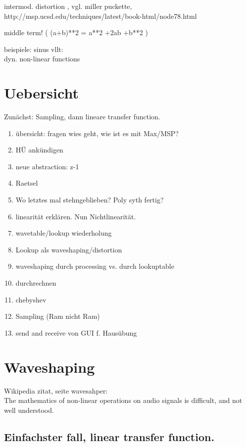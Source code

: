 \glqq{}intermod. distortion \grqq{} , vgl. miller puckette, \\
http://msp.ucsd.edu/techniques/latest/book-html/node78.html

middle term! ( (a+b)**2 = a**2 +2ab +b**2 ) 




beispiele:
sinus
vllt:\\
dyn. non-linear functions




\section{Uebersicht}
Zunächst: Sampling, dann lineare transfer function.

\begin{enumerate}
	\item übersicht: fragen wies geht, wie ist es mit Max/MSP?
	\item HÜ ankündigen
	\item neue abstraction: z-1 
	\item Raetsel
	\item Wo letztes mal stehngeblieben? Poly syth fertig?
	\item linearität erklären. Nun Nichtlinearität.
	\item wavetable/lookup wiederholung
	\item Lookup als waveshaping/distortion
	\item waveshaping durch processing vs. durch lookuptable
	\item durchrechnen
	\item chebyshev
	\item Sampling (Ram nicht Ram)
	\item send and receive von GUI f. Hausübung
\end{enumerate}

\section{Waveshaping}
Wikipedia zitat, seite wavesahper:\\
\glqq{}The mathematics of non-linear operations on audio signals is difficult, and not well understood.\grqq{}



\subsection{Einfachster fall, linear transfer function.} %
\label{sub:linearTrans}

